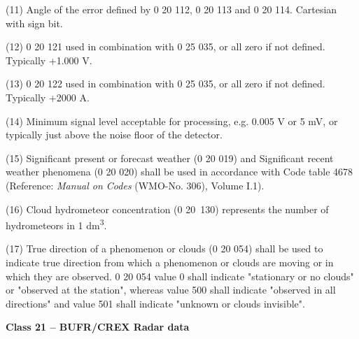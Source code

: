 (11) Angle of the error defined by 0 20 112, 0 20 113 and 0 20 114. Cartesian with sign bit.

(12) 0 20 121 used in combination with 0 25 035, or all zero if not defined. Typically +1.000 V.

(13) 0 20 122 used in combination with 0 25 035, or all zero if not defined. Typically +2000 A.

(14) Minimum signal level acceptable for processing, e.g. 0.005 V or 5 mV, or typically just above the noise floor of the detector.

(15) Significant present or forecast weather (0 20 019) and Significant recent weather phenomena (0 20 020) shall be used in accordance with Code table 4678 (Reference: \emph{Manual on Codes} (WMO-No. 306), Volume I.1).

(16) Cloud hydrometeor concentration (0 20~130) represents the number of hydrometeors in 1 dm\textsuperscript{3}.

(17) True direction of a phenomenon or clouds (0 20 054) shall be used to indicate true direction from which a phenomenon or clouds are moving or in which they are observed. 0 20 054 value 0 shall indicate "stationary or no clouds" or "observed at the station", whereas value 500 shall indicate "observed in all directions" and value 501 shall indicate "unknown or clouds invisible".

\textbf{Class 21 -- BUFR/CREX Radar data}

